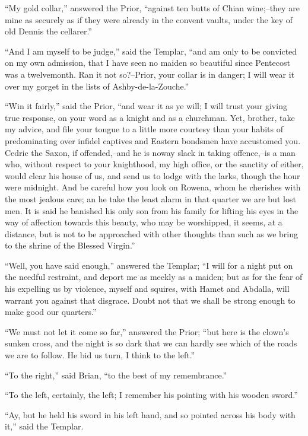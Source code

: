 ``My gold collar,'' answered the Prior, ``against ten butts of Chian
wine;--they are mine as securely as if they were already in the convent
vaults, under the key of old Dennis the cellarer.''

``And I am myself to be judge,'' said the Templar, ``and am only to be
convicted on my own admission, that I have seen no maiden so beautiful
since Pentecost was a twelvemonth. Ran it not so?--Prior, your collar is
in danger; I will wear it over my gorget in the lists of
Ashby-de-la-Zouche.''

``Win it fairly,'' said the Prior, ``and wear it as ye will; I will
trust your giving true response, on your word as a knight and as a
churchman. Yet, brother, take my advice, and file your tongue to a
little more courtesy than your habits of predominating over infidel
captives and Eastern bondsmen have accustomed you. Cedric the Saxon, if
offended,--and he is noway slack in taking offence,--is a man who,
without respect to your knighthood, my high office, or the sanctity of
either, would clear his house of us, and send us to lodge with the
larks, though the hour were midnight. And be careful how you look on
Rowena, whom he cherishes with the most jealous care; an he take the
least alarm in that quarter we are but lost men. It is said he banished
his only son from his family for lifting his eyes in the way of
affection towards this beauty, who may be worshipped, it seems, at a
distance, but is not to be approached with other thoughts than such as
we bring to the shrine of the Blessed Virgin.''

``Well, you have said enough,'' answered the Templar; ``I will for a
night put on the needful restraint, and deport me as meekly as a maiden;
but as for the fear of his expelling us by violence, myself and squires,
with Hamet and Abdalla, will warrant you against that disgrace. Doubt
not that we shall be strong enough to make good our quarters.''

``We must not let it come so far,'' answered the Prior; ``but here is
the clown's sunken cross, and the night is so dark that we can hardly
see which of the roads we are to follow. He bid us turn, I think to the
left.''

``To the right,'' said Brian, ``to the best of my remembrance.''

``To the left, certainly, the left; I remember his pointing with his
wooden sword.''

``Ay, but he held his sword in his left hand, and so pointed across his
body with it,'' said the Templar.

